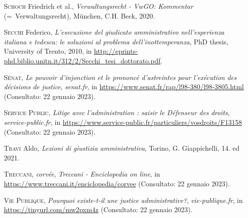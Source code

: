 \documentclass[12pt,it,a4paper,]{report}
\newlength{\cslhangindent}
\newenvironment{CSLReferences}[2] %
 {%
  \setlength{\parindent}{0pt}
  \ifodd #1 \everypar{\setlength{\hangindent}{\cslhangindent}}\ignorespaces\fi
  \ifnum #2 > 0
  \setlength{\parskip}{#2\baselineskip}
  \fi
 }%
 {}
\begin{document}
\begin{CSLReferences}{1}{0}
\leavevmode{}%
\textsc{Schoch} Friedrich et al., \emph{Verwaltungsrecht - VwGO:
Kommentar} (=~Verwaltungsrecht), München, C.H. Beck, 2020.

\leavevmode{}%
\textsc{Secchi} Federico, \emph{L'esecuzione del giudicato
amministrativo nell'esperienza italiana e tedesca: le soluzioni al
problema dell'inottemperanza}, PhD thesis, University of Trento, 2010,
in
\url{http://eprints-phd.biblio.unitn.it/312/2/Secchi_tesi_dottorato.pdf}.

\leavevmode{}%
\textsc{Sénat}, \emph{Le pouvoir d'injonction et le prononcé
d'astreintes pour l'exécution des décisions de justice},
\emph{senat.fr}, in \url{https://www.senat.fr/rap/l98-380/l98-3805.html}
(Consultato: 22 gennaio 2023).

\leavevmode{}%
\textsc{Service Public}, \emph{Litige avec l'administration : saisir le
Défenseur des droits}, \emph{service-public.fr}, in
\url{https://www.service-public.fr/particuliers/vosdroits/F13158}
(Consultato: 22 gennaio 2023).

\leavevmode{}%
\textsc{Travi} Aldo, \emph{Lezioni di giustizia amministrativa}, Torino,
G. Giappichelli, 14. ed 2021.

\leavevmode{}%
\textsc{Treccani}, \emph{corvée}, \emph{Treccani - Enciclopedia on
line}, in \url{https://www.treccani.it/enciclopedia/corvee} (Consultato:
22 gennaio 2023).

\leavevmode{}%
\textsc{Vie Publique}, \emph{Pourquoi existe-t-il une justice
administrative?}, \emph{vie-publique.fr}, in
\url{https://tinyurl.com/mw2pxm4z} (Consultato: 22 gennaio 2023).

\end{CSLReferences}
\end{document}
